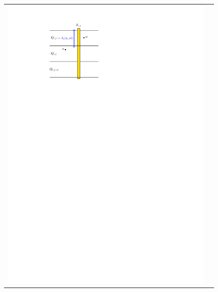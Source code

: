 \documentclass{patmorin}
\begin{document}
\begin{figure}
\begin{tabular}{cc}
    \includegraphics[page=2]{figs/new_metric} \\

\end{tabular}
\end{figure}
\end{document}
